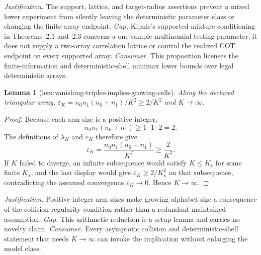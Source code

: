 \documentclass{article}
\newtheorem{lemma}{Lemma}
\begin{document}
\par\smallskip\noindent \textit{Justification.} The support, lattice, and target-radius assertions prevent a mixed lower experiment from silently leaving the deterministic parameter class or changing the finite-array endpoint. \textit{Gap.} Kipnis's supported-mixture conditioning in Theorems~2.1 and~2.3 concerns a one-sample multinomial testing parameter; it does not supply a two-array correlation lattice or control the realized COT endpoint on every supported array. \textit{Consumer.} This proposition licenses the finite-information and deterministic-shell minimax lower bounds over legal deterministic arrays.

\begin{lemma}[lem:vanishing-triples-implies-growing-cells]\label{lem:vanishing-triples-implies-growing-cells}
Along the declared triangular array, \(\varepsilon_K=n_0n_1(n_0+n_1)/K^2\ge 2/K^2\) and \(K\to\infty\).
\end{lemma}
\begin{proof}
Because each arm size is a positive integer,
\[
 n_0n_1(n_0+n_1)\ge1\cdot1\cdot2=2.
\]
The definitions of \(\lambda_K\) and \(\varepsilon_K\) therefore give
\[
 \varepsilon_K=\frac{n_0n_1(n_0+n_1)}{K^2}\ge\frac2{K^2}.
\]
If \(K\) failed to diverge, an infinite subsequence would satisfy \(K\le K_\star\) for some finite \(K_\star\), and the last display would give \(\varepsilon_K\ge2/K_\star^2\) on that subsequence, contradicting the assumed convergence \(\varepsilon_K\to0\).  Hence \(K\to\infty\).
\end{proof}
\par\smallskip\noindent \textit{Justification.} Positive integer arm sizes make growing alphabet size a consequence of the collision regularity condition rather than a redundant maintained assumption. \textit{Gap.} This arithmetic reduction is a setup lemma and carries no novelty claim. \textit{Consumer.} Every asymptotic collision and deterministic-shell statement that needs \(K\to\infty\) can invoke the implication without enlarging the model class.
\end{document}
